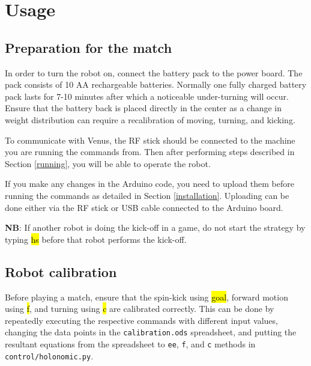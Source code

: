 \documentclass[a4paper,12pt]{article}
\newcommand{\hg}[1]{\hl{\ttfamily #1}}
\begin{document}
\section{Usage}

\subsection{Preparation for the match}

In order to turn the robot on, connect the battery pack to the power board. The pack consists of 10 AA rechargeable batteries. Normally one fully charged battery pack lasts for 7-10 minutes after which a noticeable under-turning will occur. Ensure that the battery back is placed directly in the center as a change in weight distribution can require a recalibration of moving, turning, and kicking.

To communicate with Venus, the RF stick should be connected to the machine you are running the commands from. Then after performing steps described in Section \ref{running}, you will be able to operate the robot.

If you make any changes in the Arduino code, you need to upload them before running the commands as detailed in Section \ref{installation}. Uploading can be done either via the RF stick or USB cable connected to the Arduino board.

\textbf{NB}: If another robot is doing the kick-off in a game, do not start the strategy by typing \hg{hs} before that robot performs the kick-off.

\subsection{Robot calibration}

Before playing a match, ensure that the spin-kick using \hg{goal}, forward motion using \hg{f}, and turning using \hg{c} are calibrated correctly. This can be done by repeatedly executing the respective commands with different input values, changing the data points in the \texttt{calibration.ods} spreadsheet, and putting the resultant equations from the spreadsheet to \texttt{ee}, \texttt{f}, and \texttt{c} methods in \texttt{control/holonomic.py}.
\end{document}

